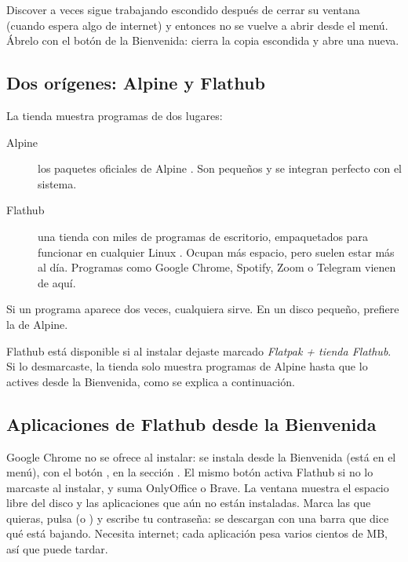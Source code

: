 \begin{nota}
Discover a veces sigue trabajando escondido después de cerrar su
ventana (cuando espera algo de internet) y entonces no se vuelve a
abrir desde el menú. Ábrelo con el botón 
de la Bienvenida: cierra la copia escondida y abre una nueva.
\end{nota}

\subsection{Dos orígenes: Alpine y Flathub}
La tienda muestra programas de dos lugares:
\begin{description}
  \item[Alpine] los paquetes oficiales de Alpine \cite{alpine-apk}. Son
    pequeños y se integran perfecto con el sistema.
  \item[Flathub] una tienda con miles de programas de escritorio,
    empaquetados para funcionar en cualquier Linux \cite{flathub,flatpak-docs}.
    Ocupan más espacio, pero suelen estar más al día. Programas como
    Google Chrome, Spotify, Zoom o Telegram vienen de aquí.
\end{description}
Si un programa aparece dos veces, cualquiera sirve. En un disco pequeño,
prefiere la de Alpine.

\begin{nota}
Flathub está disponible si al instalar dejaste marcado \emph{Flatpak +
tienda Flathub}. Si lo desmarcaste, la tienda solo muestra programas de
Alpine hasta que lo actives desde la Bienvenida, como se explica a
continuación.
\end{nota}

\subsection{Aplicaciones de Flathub desde la Bienvenida}\label{sec:flathub-bienvenida}
Google Chrome no se ofrece al instalar: se instala desde la Bienvenida
(está en el menú), con el botón , en la
sección . El mismo botón activa
Flathub si no lo marcaste al instalar, y suma OnlyOffice o Brave.
La ventana muestra el espacio libre del disco y las aplicaciones que aún
no están instaladas. Marca las que quieras, pulsa  (o
) y escribe tu contraseña: se descargan con una barra que
dice qué está bajando. Necesita internet; cada aplicación pesa varios
cientos de MB, así que puede tardar.

